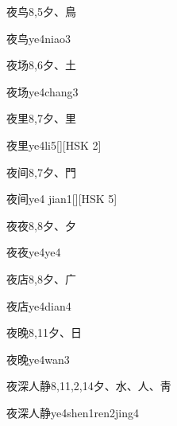 \begin{entry}{夜鸟}{8,5}{⼣、⿃}
  \begin{phonetics}{夜鸟}{ye4niao3}
  \end{phonetics}
\end{entry}

\begin{entry}{夜场}{8,6}{⼣、⼟}
  \begin{phonetics}{夜场}{ye4chang3}
  \end{phonetics}
\end{entry}

\begin{entry}{夜里}{8,7}{⼣、⾥}
  \begin{phonetics}{夜里}{ye4li5}[][HSK 2]
  \end{phonetics}
\end{entry}

\begin{entry}{夜间}{8,7}{⼣、⾨}
  \begin{phonetics}{夜间}{ye4 jian1}[][HSK 5]
  \end{phonetics}
\end{entry}

\begin{entry}{夜夜}{8,8}{⼣、⼣}
  \begin{phonetics}{夜夜}{ye4ye4}
  \end{phonetics}
\end{entry}

\begin{entry}{夜店}{8,8}{⼣、⼴}
  \begin{phonetics}{夜店}{ye4dian4}
  \end{phonetics}
\end{entry}

\begin{entry}{夜晚}{8,11}{⼣、⽇}
  \begin{phonetics}{夜晚}{ye4wan3}
  \end{phonetics}
\end{entry}

\begin{entry}{夜深人静}{8,11,2,14}{⼣、⽔、⼈、⾭}
  \begin{phonetics}{夜深人静}{ye4shen1ren2jing4}
  \end{phonetics}
\end{entry}


